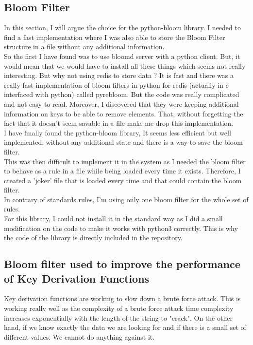 \documentclass{eplmastersthesis}
\begin{document}
\subsection{Bloom Filter}
In this section, I will argue the choice for the python-bloom library. I needed to find a fast implementation where I was also able to store the Bloom Filter structure in a file without any additional information.\\
So the first I have found was to use bloomd server with a python client. But, it would mean that we would have to install all these things which seems not really interesting. But why not using redis to store data ? It is fast and there was a really fast implementation of bloom filters in python for redis (actually in c interfaced with python) called pyrebloom. But the code was really complicated and not easy to read. Moreover, I discovered that they were keeping additional information on keys to be able to remove elements. That, without forgetting the fact that it doesn't seem savable in a file make me drop this implementation.\\
I have finally found the python-bloom library, It seems less efficient but well implemented, without any additional state and there is a way to save the bloom filter.\\

This was then difficult to implement it in the system as I needed the bloom filter to behave as a rule in a file while being loaded every time it exists. Therefore, I created a 'joker' file that is loaded every time and that could contain the bloom filter.\\
In contrary of standards rules, I'm using only one bloom filter for the whole set of rules.\\

For this library, I could not install it in the standard way as I did a small modification on the code to make it works with python3 correctly. This is why the code of the library is directly included in the repository.


\subsection{Bloom filter used to improve the performance of Key Derivation Functions}
Key derivation functions are working to slow down a brute force attack. This is working really well as the complexity of a brute force attack time complexity increases exponentially with the length of the string to "crack". On the other hand, if we know exactly the data we are looking for and if there is a small set of different values. We cannot do anything against it. \\
\end{document}
